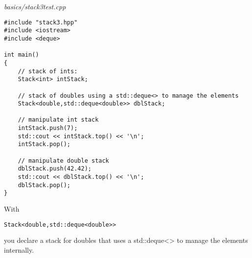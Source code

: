 \noindent
\textit{basics/stack3test.cpp}
\begin{lstlisting}[style=styleCXX]
#include "stack3.hpp"
#include <iostream>
#include <deque>

int main()
{
	// stack of ints:
	Stack<int> intStack;

	// stack of doubles using a std::deque<> to manage the elements
	Stack<double,std::deque<double>> dblStack;

	// manipulate int stack
	intStack.push(7);
	std::cout << intStack.top() << '\n';
	intStack.pop();

	// manipulate double stack
	dblStack.push(42.42);
	std::cout << dblStack.top() << '\n';
	dblStack.pop();
}
\end{lstlisting}

With

\begin{lstlisting}[style=styleCXX]
Stack<double,std::deque<double>>
\end{lstlisting}

you declare a stack for doubles that uses a std::deque<> to manage the elements internally.















